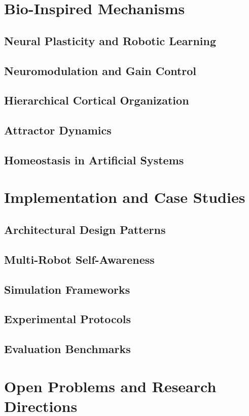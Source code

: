 \documentclass[a4paper]{article}
\begin{document}
\section{Bio-Inspired Mechanisms}

	\subsection{Neural Plasticity and Robotic Learning}
	\subsection{Neuromodulation and Gain Control}
	\subsection{Hierarchical Cortical Organization}
	\subsection{Attractor Dynamics}
	\subsection{Homeostasis in Artificial Systems}

\section{Implementation and Case Studies}

	\subsection{Architectural Design Patterns}
	\subsection{Multi-Robot Self-Awareness}
	\subsection{Simulation Frameworks}
	\subsection{Experimental Protocols}
	\subsection{Evaluation Benchmarks}

\section{Open Problems and Research Directions}
\end{document}
